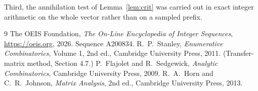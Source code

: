 \documentclass[11pt,a4paper]{article}
\theoremstyle{plain}
\theoremstyle{definition}
\begin{document}
Third, the annihilation test of Lemma~\ref{lem:crit} was carried out in exact integer
arithmetic on the whole vector rather than on a sampled prefix.

\begin{thebibliography}{9}
 The OEIS Foundation, \emph{The On-Line Encyclopedia of Integer
Sequences}, \url{https://oeis.org}, 2026. Sequence A200834.
 R.~P.~Stanley, \emph{Enumerative Combinatorics}, Volume 1, 2nd ed.,
Cambridge University Press, 2011. (Transfer-matrix method, Section 4.7.)
 P.~Flajolet and R.~Sedgewick, \emph{Analytic Combinatorics}, Cambridge
University Press, 2009.
 R.~A.~Horn and C.~R.~Johnson, \emph{Matrix Analysis}, 2nd ed., Cambridge
University Press, 2013.
\end{thebibliography}
\end{document}
